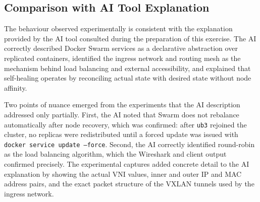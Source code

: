 \documentclass[12pt]{article}
\begin{document}
\subsection{Comparison with AI Tool Explanation}
 
The behaviour observed experimentally is consistent with the explanation provided by the AI tool consulted during the preparation of this exercise. The AI correctly described Docker Swarm services as a declarative abstraction over replicated containers, identified the ingress network and routing mesh as the mechanism behind load balancing and external accessibility, and explained that self-healing operates by reconciling actual state with desired state without node affinity.
 
Two points of nuance emerged from the experiments that the AI description addressed only partially. First, the AI noted that Swarm does not rebalance automatically after node recovery, which was confirmed: after \texttt{ub3} rejoined the cluster, no replicas were redistributed until a forced update was issued with \texttt{docker service update --force}. Second, the AI correctly identified round-robin as the load balancing algorithm, which the Wireshark and client output confirmed precisely. The experimental captures added concrete detail to the AI explanation by showing the actual VNI values, inner and outer IP and MAC address pairs, and the exact packet structure of the VXLAN tunnels used by the ingress network.
\end{document}
